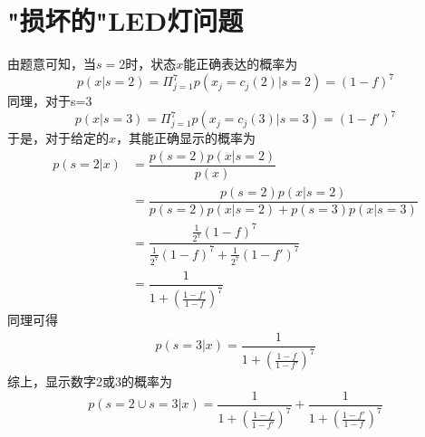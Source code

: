 \documentclass{article}
\begin{document}
\section{"损坏的"LED灯问题}
由题意可知，当$ s=2 $时，状态$x$能正确表达的概率为
\begin{equation}
	p(x|s=2)=\Pi_{j=1}^{7}p(x_j=c_j(2)|s=2)=(1-f)^7
\end{equation}
同理，对于s=3
\begin{equation}
	p(x|s=3)=\Pi_{j=1}^{7}p(x_j=c_j(3)|s=3)=(1-f')^7
\end{equation}
于是，对于给定的$x$，其能正确显示的概率为
\begin{equation}
\begin{aligned}
p(s=2|x) &=\dfrac{p(s=2)p(x|s=2)}{p(x)}\\
&= \dfrac{p(s=2)p(x|s=2)}{p(s=2)p(x|s=2)+p(s=3)p(x|s=3)}\\
&=\dfrac{\frac{1}{2^7}(1-f)^7}{\frac{1}{2^7}(1-f)^7+\frac{1}{2^7}(1-f')^7}\\
&=\dfrac{1}{1+(\frac{1-f'}{1-f})^7}
\end{aligned}
\end{equation}
同理可得
\begin{equation}
	\begin{aligned}
		p(s=3|x) = \dfrac{1}{1+(\frac{1-f}{1-f’})^7}
	\end{aligned}
\end{equation}
综上，显示数字2或3的概率为
\begin{equation}
p(s=2\cup s=3|x)=\dfrac{1}{1+(\frac{1-f}{1-f'})^7}+\dfrac{1}{1+(\frac{1-f'}{1-f})^7}
\end{equation}
\end{document}
